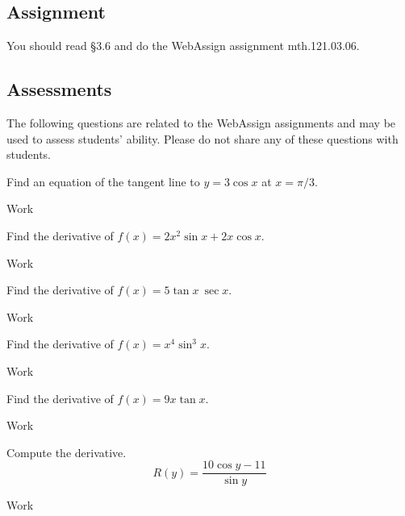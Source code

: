 \documentclass[12pt,addpoints, answers, fleqn]{exam}
\begin{document}
\subsection{Assignment}
You should read \S  3.6 and do the WebAssign assignment mth.121.03.06.
\vfill
\pagebreak
\begin{teacher}
\subsection{Assessments}
The following questions are related to the WebAssign assignments and may be used to assess students' ability. Please do not share any of these questions with students.
\begin{questions}		
\question 	%

Find an equation of the tangent line to $y = 3 \cos x$ at $x = \pi/3$.
\begin{solution}
Work
\end{solution}

\question 	%

Find the derivative of $f\left(x\right) = 2x^2 \sin x + 2x \cos x$.
\begin{solution}
Work
\end{solution}

\question 	%

Find the derivative of $f\left(x\right) = 5 \tan x \ \sec x$.
\begin{solution}
Work
\end{solution}

\question 	%

Find the derivative of $f\left(x\right) = x^4 \sin^3 x$.
\begin{solution}
Work
\end{solution}

\question 	%

Find the derivative of $f\left(x\right) = 9x \tan x$.
\begin{solution}
Work
\end{solution}

\question 	%

Compute the derivative.
\[
R\left(y\right) =  \frac{10 \cos y - 11}{\sin y}
\]
\begin{solution}
Work
\end{solution}
\question 	%


\end{questions}
\end{teacher}
\end{document}
